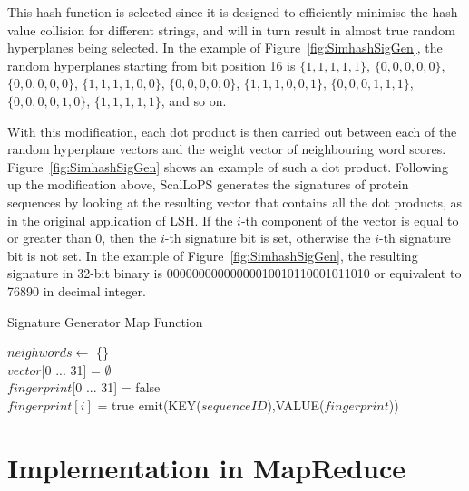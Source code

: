 \documentclass[titlepage]{csetr}
\begin{document}
This hash function is selected since it is designed to efficiently minimise the hash value collision for different strings, and will in turn result in almost true random hyperplanes being selected. In the example of Figure~\ref{fig:SimhashSigGen}, the random hyperplanes starting from bit position 16 is $\{1,1,1,1,1\}$, $\{0,0,0,0,0\}$, $\{0,0,0,0,0\}$, $\{1,1,1,1,0,0\}$, $\{0,0,0,0,0\}$, $\{1,1,1,0,0,1\}$, $\{0,0,0,1,1,1\}$, $\{0,0,0,0,1,0\}$, $\{1,1,1,1,1\}$, and so on.

With this modification, each dot product is then carried out between each of the random hyperplane vectors and the weight vector of neighbouring word scores. Figure~\ref{fig:SimhashSigGen} shows an example of such a dot product. Following up the modification above, ScalLoPS generates the signatures of protein sequences by looking at the resulting vector that contains all the dot products, as in the original application of LSH. If the $i$-th component of the vector is equal to or greater than 0, then the $i$-th signature bit is set, otherwise the $i$-th signature bit is not set. In the example of Figure~\ref{fig:SimhashSigGen}, the resulting signature in 32-bit binary is 00000000000000010010110001011010 or equivalent to 76890 in decimal integer.



\begin{algorithm} [t]
 	\caption{Signature Generator Map Function}
	\label{alg:SimhashSigGen}
	\SetAlgoLined
	$neighwords \gets$ \{\}\\
	$vector$[0 ... 31] = $\emptyset$\\
	$fingerprint$[0 ... 31] = false\\
	 {
		 {
			$fingerprint[i]$ = true
		}
	}
	emit(KEY($sequenceID$),VALUE($fingerprint$))
\end{algorithm}

\section{Implementation in MapReduce}
\label{sec:MapReduce}
\end{document}
